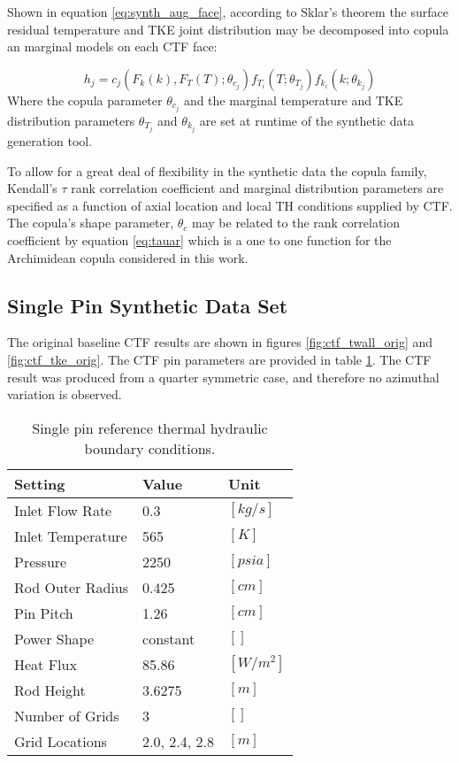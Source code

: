 Shown in equation \ref{eq:synth_aug_face}, according to Sklar's theorem the surface residual temperature and TKE joint distribution may be decomposed into copula an marginal models on each CTF face:

\begin{equation}
    h_j = c_j(F_k(k), F_T(T); \theta_{c_j}) f_{T_i}(T; \theta_{T_j}) f_{k_i}(k; \theta_{k_j})
    \label{eq:synth_aug_face}
\end{equation}
Where the copula parameter $\theta_{c_j}$ and the marginal temperature and TKE distribution parameters $\theta_{T_j}$ and $\theta_{k_j}$ are set at runtime of the synthetic data generation tool.

To allow for a great deal of flexibility in the synthetic data the copula family, Kendall's $\tau$ rank correlation coefficient and marginal distribution parameters are specified as a function of axial location and local TH conditions supplied by CTF.  The copula's shape parameter, $\theta_c$ may be related to the rank correlation coefficient by equation \ref{eq:tauar} which is a one to one function for the Archimidean copula considered in this work.


\subsection{Single Pin Synthetic Data Set}

The original baseline CTF results are shown in figures \ref{fig:ctf_twall_orig} and \ref{fig:ctf_tke_orig}.  The CTF pin parameters are provided in table \ref{tab:pin_settings}.  The CTF result was produced from a quarter symmetric case, and therefore no azimuthal variation is observed.

\begin{table}[h]
    \begin{center}
        \caption{Single pin reference thermal hydraulic boundary conditions.}
        \begin{tabular}{|l|l|l|}
            \hline
            Setting & Value & Unit \\
            \hline
            Inlet Flow Rate & 0.3 & $[kg/s]$ \\
            Inlet Temperature & 565 & $[K]$ \\
            Pressure & 2250 & $[psia]$ \\
            Rod Outer Radius & 0.425 & $[cm]$ \\
            Pin Pitch & 1.26 & $[cm]$ \\
            Power Shape & constant & $[]$ \\
            Heat Flux & 85.86  & $[W/m^2]$ \\
            Rod Height & 3.6275 & $[m]$ \\
            Number of Grids & 3  & $[]$ \\
            Grid Locations & 2.0, 2.4, 2.8 & $[m]$ \\
            \hline
        \end{tabular}
    \label{tab:pin_settings}
    \end{center}
\end{table}

